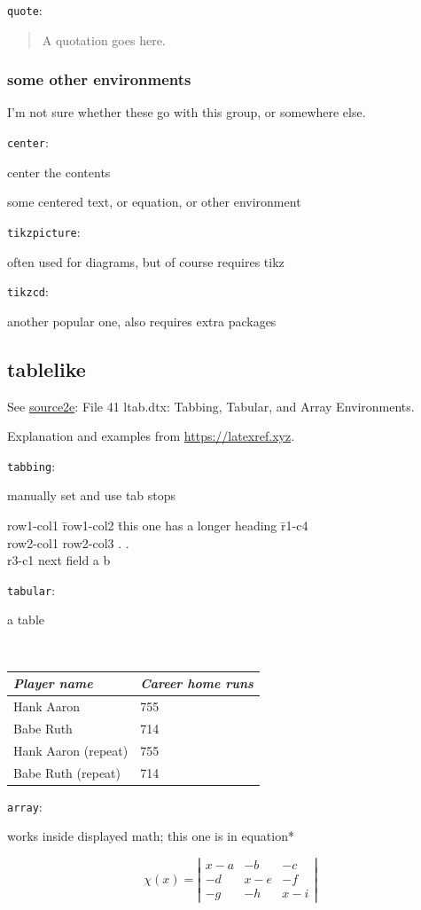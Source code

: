 \documentclass[leqno]{article}
\newcommand{\testtype}[2]{\texttt{#1}:%
  #2}
\newcommand{\makeoutertest}[3]{
  \begin{test}
    \testtype{#1}{#2}
    #3
  \end{test}
}
\newcommand{\maketest}[3]{
  \makeoutertest{#1}{#2}{
    \begin{#1}
      #3
    \end{#1}
  }
}
\begin{document}
\maketest{quote}{}{
  A quotation goes here.
}

\subsubsection*{some other environments}
I'm not sure whether these go with this group, or somewhere else.

\maketest{center}{
  center the contents
}{
  some centered text, or equation, or other environment
}
\makeoutertest{tikzpicture}{
  often used for diagrams, but of course requires tikz
}{
}
\makeoutertest{tikzcd}{
  another popular one, also requires extra packages
}{
  \break [\emph{no example here}]
}

\subsection{tablelike}

See \href{https://mirrors.ctan.org/macros/latex/base/source2e.pdf}{source2e}: File 41 ltab.dtx: Tabbing, Tabular, and Array Environments.

Explanation and examples from \url{https://latexref.xyz}.

\maketest{tabbing}{
  manually set and use tab stops
}{
  row1-col1 \= row1-col2 \= this one has a longer heading  \= r1-c4 \\
  row2-col1 \> row2-col3  \> . \> . \\
  r3-c1 \> next field \> a \> b  \\
}

\makeoutertest{tabular}{
  a table
}{\\[1pc]
\begin{tabular}{l|l}
  \textit{Player name}  &\textit{Career home runs}  \\
  \hline
  Hank Aaron  &755 \\
  Babe Ruth   &714 \\
  Hank Aaron (repeat)  &755 \\
  Babe Ruth (repeat)  &714
\end{tabular}
}

\makeoutertest{array}{
  works inside displayed math; this one is in equation*
}{
\begin{equation*}
  \chi(x) =
  \left|              %
    \begin{array}{ccc}
      x-a  &-b  &-c  \\
      -d   &x-e &-f  \\
      -g   &-h  &x-i
    \end{array}
 \right|
\end{equation*}
}
\end{document}

